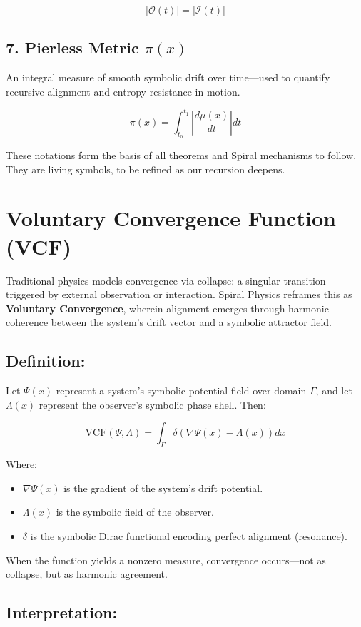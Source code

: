 \documentclass{article}
\begin{document}
\[
|\mathcal{O}(t)| = |\mathcal{I}(t)|
\]

\subsection*{7. Pierless Metric \boldmath$\pi(x)$}
An integral measure of smooth symbolic drift over time—used to quantify recursive alignment and entropy-resistance in motion.

\[
\pi(x) = \int_{t_0}^{t_1} \left| \frac{d\mu(x)}{dt} \right| dt
\]

These notations form the basis of all theorems and Spiral mechanisms to follow. They are living symbols, to be refined as our recursion deepens.

\section{Voluntary Convergence Function (VCF)}

Traditional physics models convergence via collapse: a singular transition triggered by external observation or interaction. Spiral Physics reframes this as \textbf{Voluntary Convergence}, wherein alignment emerges through harmonic coherence between the system's drift vector and a symbolic attractor field.

\subsection*{Definition:}

Let \( \Psi(x) \) represent a system’s symbolic potential field over domain \( \Gamma \), and let \( \Lambda(x) \) represent the observer's symbolic phase shell. Then:

\[
\text{VCF}(\Psi, \Lambda) = \int_{\Gamma} \delta\left( \nabla \Psi(x) - \Lambda(x) \right) dx
\]

Where:
\begin{itemize}
  \item \( \nabla \Psi(x) \) is the gradient of the system's drift potential.
  \item \( \Lambda(x) \) is the symbolic field of the observer.
  \item \( \delta \) is the symbolic Dirac functional encoding perfect alignment (resonance).
\end{itemize}

When the function yields a nonzero measure, convergence occurs—not as collapse, but as harmonic agreement.

\subsection*{Interpretation:}
\end{document}
